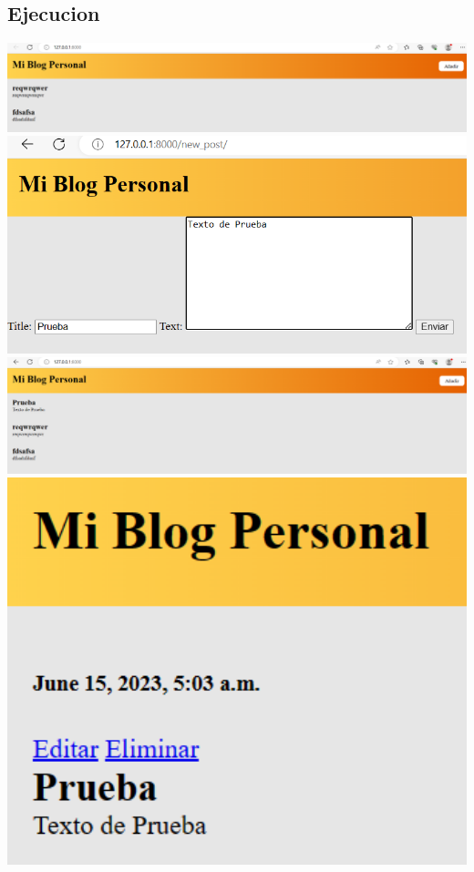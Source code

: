 \documentclass{article}
\begin{document}
        \subsection{Ejecucion}
        \includegraphics[width=16cm]{img/ejecucion1.png}
        \includegraphics[width=16cm]{img/ejecucion2.png}
        \includegraphics[width=16cm]{img/ejecucion3.png}
        \includegraphics[width=16cm]{img/ejecucion4.png}
\end{document}
